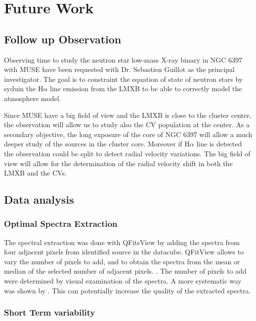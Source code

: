 \chapter{Future Work}\label{chap:future}
\thispagestyle{fancy}

\section{Follow up Observation}

Observing time to study  the neutron star low-mass X-ray binary in NGC 6397 with MUSE have been requested with Dr. Sebastien Guillot as the principal investigator. The goal is to constraint the equation of state of neutron stars by syduin the H$\alpha$ line emission from the LMXB to be able to correctly model the atmosphere model. 

 Since MUSE have a big field of view and the LMXB is close to the cluster center, the observation will allow us to study also the CV population at the center. As a secondary objective, the long exposure of the core of NGC 6397 will allow a much deeper study of the sources in the cluster core. Moreover if H$\alpha$ line is detected the observation could be split to detect radial velocity variations. The big field of view will allow for the determination of the radial velocity shift in both the LMXB and the CVs.  
    
\section{Data analysis}

\subsection{Optimal Spectra Extraction}

The spectral extraction was done with QFitsView by adding the spectra from four adjacent pixels from identified source in the datacube. QFitView allows to vary the number of pixels to add, and to obtain the spectra from the mean or median of the selected number of adjacent pixels. . The number of pixels to add were determined by visual examination of the spectra. A more systematic way was shown by \cite{horne_emission_1986}. This can potentially increase the quality of the extracted spectra. 

\subsection{Short Term variability}

